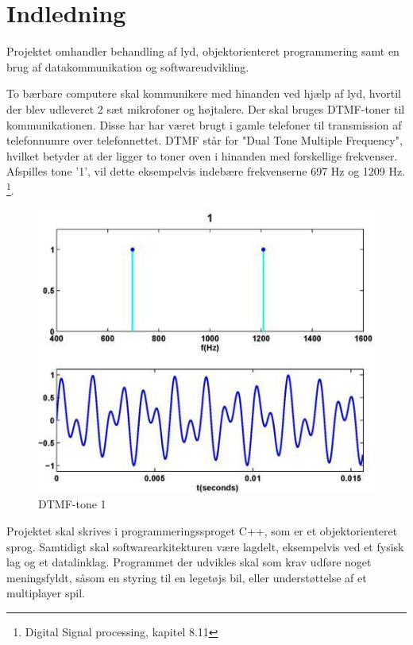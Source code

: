 \section{Indledning}
Projektet omhandler behandling af lyd, objektorienteret programmering samt en brug af datakommunikation og softwareudvikling.

To bærbare computere skal kommunikere med hinanden ved hjælp af lyd, hvortil der blev udleveret 2 sæt mikrofoner og højtalere.
Der skal bruges DTMF-toner til kommunikationen. Disse har har været brugt i gamle telefoner til transmission af telefonnumre over telefonnettet. DTMF står for "Dual Tone Multiple Frequency", hvilket betyder at der ligger to toner oven i hinanden med forskellige frekvenser. Afspilles tone '1', vil dette eksempelvis indebære frekvenserne 697 Hz og 1209 Hz. \footnote{Digital Signal processing, kapitel 8.11}.

\begin{figure}[h]
\centering
\includegraphics[scale=0.5]{Billeder/DTMF1.JPG}
\caption{DTMF-tone 1}
\label{fig:DTMF1}
\end{figure}

Projektet skal skrives i programmeringssproget C++, som er et objektorienteret sprog. Samtidigt skal softwarearkitekturen være lagdelt, eksempelvis ved et fysisk lag og et datalinklag.
Programmet der udvikles skal som krav udføre noget meningsfyldt, såsom en styring til en legetøjs bil, eller understøttelse af et multiplayer spil.